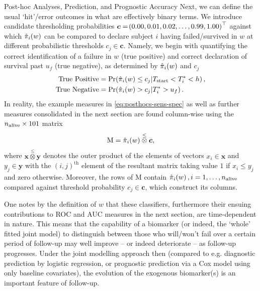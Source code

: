 \begin{chapter}{\label{cha:posthoc}Post-hoc Analyses, Prediction, and Prognostic Accuracy}
Next, we can define the usual `hit'/error outcomes in what are effectively binary terms. We introduce candidate thresholding probabilities $\bm{c}=\!\left(0.00,0.01,0.02,\dots,0.99,1.00\right)^\top$ against which $\hat{\pi}_i\!\left( w\right)$ can be compared to declare subject $i$ having failed/survived in $w$ at different probabilistic thresholds $c_j\in\bm{c}$. Namely, we begin with quantifying the correct identification of a failure in $w$ (true positive) and correct declaration of survival past $u_f$ (true negative), as determined by $\hat{\pi}_i\!\left( w \right)$ and $c_j$ \citep{Andrinopoulou2021}
\begin{equation}
    \begin{aligned}
        \mathrm{True\ Positive} &= \Pr\!\left(\hat{\pi}_i\!\left( w \right) \le c_j|T_{\mathrm{start}} < T_i^* < h\right),\\
        \mathrm{True\ Negative} &= \Pr\!\left(\hat{\pi}_i\!\left( w \right) > c_j|T_i^*> u_f\right).
\end{aligned}
\label{eq:posthocs-sens-spec}
\end{equation}
In reality, the example measures in \eqref{eq:posthocs-sens-spec} as well as further measures consolidated in the next section are found column-wise using the $n_{\mathrm{alive}}\times101$ matrix 
\begin{equation*}
    \mathrm{M}=\hat{\pi}_i\!\left( w\right)\overset{\le}{\otimes}\bm{c},
\end{equation*}
where $\bm{x}\overset{\le}{\otimes}\bm{y}$ denotes the outer product of the elements of vectors $x_i\in\bm{x}$ and $y_j\in\bm{y}$ with the $(i,j)^{\mathrm{th}}$ element of the resultant matrix taking value $1$ if $x_i\le y_j$ and zero otherwise. Moreover, the rows of $\mathrm{M}$ contain $\hat{\pi}_i\!\left( w\right),  i=1,\dots,n_{\mathrm{alive}}$ compared against threshold probability $c_j\in\bm{c}$, which construct its columns.

\begin{remark}
    One notes by the definition of $w$ that these classifiers, furthermore their ensuing contributions to ROC and AUC measures in the next section, are time-dependent in nature. This means that the capability of a biomarker (or indeed, the `whole' fitted joint model) to distinguish between those who will/won't fail over a certain period of follow-up may well improve -- or indeed deteriorate -- as follow-up progresses. Under the joint modelling approach then (compared to e.g. diagnostic prediction by logistic regression, or prognostic prediction via a Cox model using only baseline covariates), the evolution of the exogenous biomarker(s) is an important feature of follow-up.
\end{remark}


\end{chapter}
